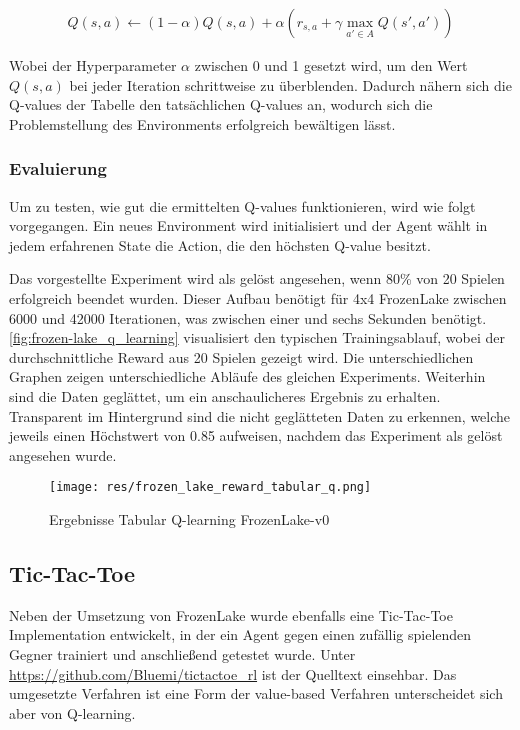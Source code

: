 \documentclass[11pt]{scrartcl}
\begin{document}
\begin{align}
  Q(s, a) \leftarrow (1 - \alpha)Q(s, a) +
  \alpha(r_{s, a} + \gamma \max_{a'\in A}Q(s', a'))
\label{aln:QValueAdapt}
\end{align}
\noindent

Wobei der Hyperparameter $\alpha$ zwischen 0 und 1 gesetzt wird, um den Wert $Q(s, a)$ bei
jeder Iteration schrittweise zu überblenden. Dadurch nähern sich die Q-values der Tabelle
den tatsächlichen Q-values an, wodurch sich die Problemstellung des Environments erfolgreich 
bewältigen lässt.

\subsubsection{Evaluierung}
Um zu testen, wie gut die ermittelten Q-values funktionieren, wird wie folgt vorgegangen.
Ein neues Environment wird initialisiert und der Agent wählt in jedem erfahrenen State die
Action, die den höchsten Q-value besitzt.

Das vorgestellte Experiment wird als gelöst angesehen, wenn 80\% von 20 Spielen erfolgreich
beendet wurden. Dieser Aufbau benötigt für 4x4 FrozenLake zwischen 6000 und 42000
Iterationen, was zwischen einer und sechs Sekunden benötigt.
\autoref{fig:frozen-lake_q_learning} visualisiert den typischen Trainingsablauf, wobei der
durchschnittliche Reward aus 20 Spielen gezeigt wird. Die unterschiedlichen Graphen zeigen
unterschiedliche Abläufe des gleichen Experiments. Weiterhin sind die Daten geglättet, um
ein anschaulicheres Ergebnis zu erhalten. Transparent im Hintergrund sind die nicht
geglätteten Daten zu erkennen, welche jeweils einen Höchstwert von 0.85 aufweisen, nachdem
das Experiment als gelöst angesehen wurde.
\begin{figure}[htp]
\centering
\texttt{[image: res/frozen\_lake\_reward\_tabular\_q.png]}
\caption{Ergebnisse Tabular Q-learning FrozenLake-v0}
\label{fig:frozen-lake_q_learning}
\end{figure}

\newpage
\subsection{Tic-Tac-Toe}
Neben der Umsetzung von FrozenLake wurde ebenfalls eine Tic-Tac-Toe Implementation
entwickelt, in der ein Agent gegen einen zufällig spielenden Gegner trainiert und
anschließend getestet wurde. Unter \url{https://github.com/Bluemi/tictactoe_rl} ist
der Quelltext einsehbar. Das umgesetzte Verfahren ist eine Form der value-based
Verfahren unterscheidet sich aber von Q-learning.
\end{document}
